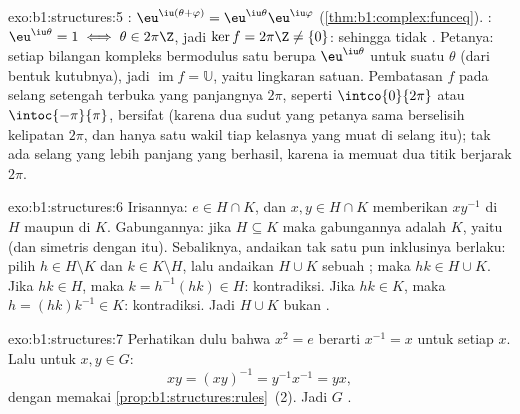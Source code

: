 \begin{solution}{exo:b1:structures:5}
: $\eu^{\iu(\theta + \varphi)} =
\eu^{\iu\theta}\eu^{\iu\varphi}$ (\cref{thm:b1:complex:funceq}).
: $\eu^{\iu\theta} = 1 \iff \theta \in 2\pi\Z$, jadi $\ker f =
2\pi\Z \neq \{0\}$: sehingga tidak . Petanya: setiap bilangan kompleks bermodulus satu berupa
$\eu^{\iu\theta}$ untuk suatu $\theta$ (dari bentuk kutubnya), jadi
$\operatorname{im} f = \mathbb{U}$, yaitu lingkaran satuan. Pembatasan
$f$ pada selang setengah terbuka yang panjangnya $2\pi$, seperti
$\intco{0}{2\pi}$ atau $\intoc{-\pi}{\pi}$, bersifat  (karena dua sudut
yang petanya sama berselisih kelipatan $2\pi$, dan hanya satu
wakil tiap kelasnya yang muat di selang itu); tak ada selang yang
lebih panjang yang berhasil, karena ia memuat dua titik berjarak
$2\pi$.
\end{solution}

\begin{solution}{exo:b1:structures:6}
Irisannya: $e \in H \cap K$, dan $x, y \in H \cap K$ memberikan
$xy^{-1}$ di $H$ maupun di $K$. Gabungannya: jika $H \subseteq K$ maka gabungannya
adalah $K$, yaitu  (dan simetris dengan itu). Sebaliknya, andaikan tak satu pun
inklusinya berlaku: pilih $h \in H \setminus K$ dan $k \in K \setminus
H$, lalu andaikan $H \cup K$ sebuah ; maka $hk \in H \cup K$.
Jika $hk \in H$, maka $k = h^{-1}(hk) \in H$: kontradiksi. Jika $hk \in
K$, maka $h = (hk)k^{-1} \in K$: kontradiksi. Jadi $H \cup K$ bukan
.
\end{solution}

\begin{solution}{exo:b1:structures:7}
Perhatikan dulu bahwa $x^2 = e$ berarti $x^{-1} = x$ untuk setiap $x$. Lalu untuk
$x, y \in G$:
\[
xy = (xy)^{-1} = y^{-1} x^{-1} = yx ,
\]
dengan memakai \cref{prop:b1:structures:rules}~(2). Jadi $G$ .
\end{solution}

